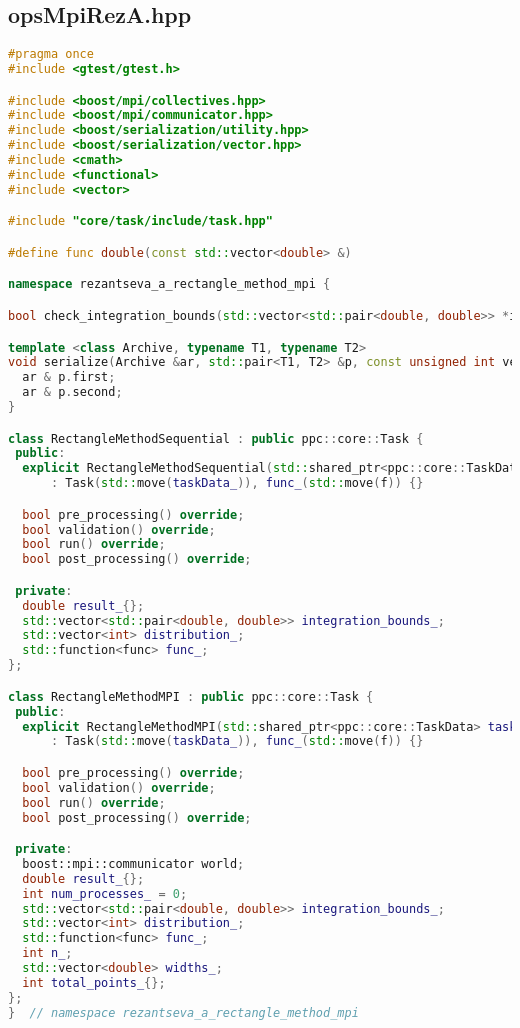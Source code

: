 \documentclass[12pt]{article}
\begin{document}
\subsection*{opsMpiRezA.hpp}
\begin{lstlisting}[language=C++]
#pragma once
#include <gtest/gtest.h>

#include <boost/mpi/collectives.hpp>
#include <boost/mpi/communicator.hpp>
#include <boost/serialization/utility.hpp>
#include <boost/serialization/vector.hpp>
#include <cmath>
#include <functional>
#include <vector>

#include "core/task/include/task.hpp"

#define func double(const std::vector<double> &)

namespace rezantseva_a_rectangle_method_mpi {

bool check_integration_bounds(std::vector<std::pair<double, double>> *ib);

template <class Archive, typename T1, typename T2>
void serialize(Archive &ar, std::pair<T1, T2> &p, const unsigned int version) {
  ar & p.first;
  ar & p.second;
}

class RectangleMethodSequential : public ppc::core::Task {
 public:
  explicit RectangleMethodSequential(std::shared_ptr<ppc::core::TaskData> taskData_, std::function<func> f)
      : Task(std::move(taskData_)), func_(std::move(f)) {}

  bool pre_processing() override;
  bool validation() override;
  bool run() override;
  bool post_processing() override;

 private:
  double result_{};
  std::vector<std::pair<double, double>> integration_bounds_;
  std::vector<int> distribution_;
  std::function<func> func_;
};

class RectangleMethodMPI : public ppc::core::Task {
 public:
  explicit RectangleMethodMPI(std::shared_ptr<ppc::core::TaskData> taskData_, std::function<func> f)
      : Task(std::move(taskData_)), func_(std::move(f)) {}

  bool pre_processing() override;
  bool validation() override;
  bool run() override;
  bool post_processing() override;

 private:
  boost::mpi::communicator world;
  double result_{};
  int num_processes_ = 0;
  std::vector<std::pair<double, double>> integration_bounds_;
  std::vector<int> distribution_;
  std::function<func> func_;
  int n_;
  std::vector<double> widths_;
  int total_points_{};
};
}  // namespace rezantseva_a_rectangle_method_mpi

\end{lstlisting}
\end{document}
